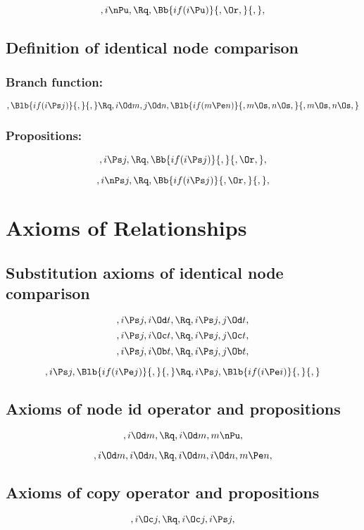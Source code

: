 \[,i \nPu , \Rq ,\Bb{if(i \Pu)}{,\Or,}{,},\]


\bigskip
\bigskip
\bigskip
\bigskip
\subsection{Definition of identical node comparison}
\subsubsection{Branch function:}
\[, \Blb{if(i \Ps j)}{,}{,} \Rq ,i \Od m ,j \Od n, \Blb{if(m \Pe n)}{,m \Os,n \Os,}{,m \Os,n \Os,}\]
\bigskip
\subsubsection{Propositions:}
\[,i \Ps j , \Rq ,\Bb{if(i \Ps j)}{,}{,\Or,},\]

\[,i \nPs j , \Rq ,\Bb{if(i \Ps j)}{,\Or,}{,},\]

\newpage





\section{Axioms of Relationships}

\subsection{Substitution axioms of identical node comparison}

\[,i \Ps j, i \Od t, \Rq , i \Ps j, j \Od t,\]
\[,i \Ps j, i \Oc t, \Rq , i \Ps j, j \Oc t,\]
\[,i \Ps j, i \Ob t, \Rq , i \Ps j, j \Ob t,\]
\bigskip
\bigskip

\[,i \Ps j, \Blb{if(i \Pe j)}{,}{,} \Rq , i \Ps j, \Blb{if(i \Pe i)}{,}{,}\]



\bigskip
\bigskip
\bigskip
\bigskip
\subsection{ Axioms of node id operator and propositions}
\[, i \Od m, \Rq , i \Od m, m \nPu,\]

\[, i \Od m, i \Od n, \Rq , i \Od m, i \Od n, m \Pe n,\]

\bigskip
\bigskip
\bigskip
\bigskip
\subsection{ Axioms of copy operator and propositions}
\[, i \Oc j , \Rq , i \Oc j , i \Ps j,\]


